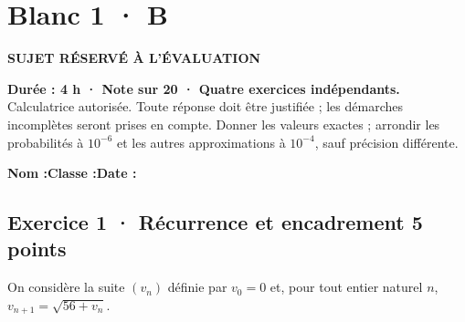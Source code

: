 \fi

\fi

\ifprof

\clearpage{}\label{sujet:5-4}

\section*{Blanc 1 · B}

{\sffamily\bfseries\color{amber}SUJET RÉSERVÉ À L'ÉVALUATION\par}

\textbf{Durée : 4 h · Note sur 20 · Quatre exercices indépendants.}\\Calculatrice autorisée. Toute réponse doit être justifiée ; les démarches incomplètes seront prises en compte. Donner les valeurs exactes ; arrondir les probabilités à $10^{-6}$ et les autres approximations à $10^{-4}$, sauf précision différente.

\smallskip\textbf{Nom :}\enspace\dotfill\quad\textbf{Classe :}\enspace\dotfill\quad\textbf{Date :}\enspace\dotfill

\subsection*{Exercice 1 · Récurrence et encadrement \hfill 5 points}On considère la suite $(v_n)$ définie par $v_0=0$ et, pour tout entier naturel $n$, $v_{n+1}=\sqrt{56+v_n}$.

